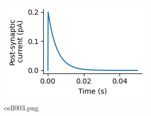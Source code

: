 \begin{figure}[ht]
	\centering
	\includegraphics[scale=0.8, max width=\linewidth]{./fig/synapse-model/kinetic-synapse/cell003.png}
	\caption{cell003.png}
	\label{cell003.png}
\end{figure}
